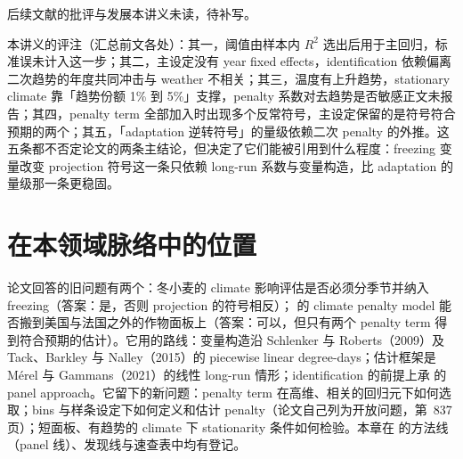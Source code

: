后续文献的批评与发展本讲义未读，待补写。

本讲义的评注（汇总前文各处）：其一，阈值由样本内 $R^2$ 选出后用于主回归，标准误未计入这一步；其二，主设定没有 year fixed effects，identification 依赖偏离二次趋势的年度共同冲击与 weather 不相关；其三，温度有上升趋势，stationary climate 靠「趋势份额 1\% 到 5\%」支撑，penalty 系数对去趋势是否敏感正文未报告；其四，penalty term 全部加入时出现多个反常符号，主设定保留的是符号符合预期的两个；其五，「adaptation 逆转符号」的量级依赖二次 penalty 的外推。这五条都不否定论文的两条主结论，但决定了它们能被引用到什么程度：freezing 变量改变 projection 符号这一条只依赖 long-run 系数与变量构造，比 adaptation 的量级那一条更稳固。

\section{在本领域脉络中的位置}

论文回答的旧问题有两个：冬小麦的 climate 影响评估是否必须分季节并纳入 freezing（答案：是，否则 projection 的符号相反）； 的 climate penalty model 能否搬到美国与法国之外的作物面板上（答案：可以，但只有两个 penalty term 得到符合预期的估计）。它用的路线：变量构造沿 Schlenker 与 Roberts（2009）及 Tack、Barkley 与 Nalley（2015）的 piecewise linear degree-days；估计框架是 Mérel 与 Gammans（2021）的线性 long-run 情形；identification 的前提上承  的 panel approach。它留下的新问题：penalty term 在高维、相关的回归元下如何选取；bins 与样条设定下如何定义和估计 penalty（论文自己列为开放问题，第~837 页）；短面板、有趋势的 climate 下 stationarity 条件如何检验。本章在  的方法线（panel 线）、发现线与速查表中均有登记。


\chapterrefs
